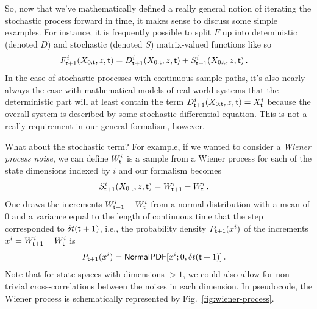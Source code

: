 So, now that we've mathematically defined a really general notion of iterating the stochastic process forward in time, it makes sense to discuss some simple examples. For instance, it is frequently possible to split $F$ up into deteministic (denoted $D$) and stochastic (denoted $S$) matrix-valued functions like so
\begin{align}
& F^{i}_{{\sf t}+1}(X_{0:{\sf t}},z,{\sf t}) = D^{i}_{{\sf t}+1}(X_{0:{\sf t}},z,{\sf t}) + S^{i}_{{\sf t}+1}(X_{0:{\sf t}},z,{\sf t}) \,.
\end{align}
In the case of stochastic processes with continuous sample paths, it's also nearly always the case with mathematical models of real-world systems that the deterministic part will at least contain the term $D^{i}_{{\sf t}+1}(X_{0:{\sf t}},z,{\sf t}) = X^i_{\sf t}$ because the overall system is described by some stochastic differential equation. This is not a really requirement in our general formalism, however.

What about the stochastic term? For example, if we wanted to consider a \emph{Wiener process noise}, we can define $W^i_{{\sf t}}$ is a sample from a Wiener process for each of the state dimensions indexed by $i$ and our formalism becomes
\begin{align}
& S^{i}_{{\sf t}+1}(X_{0:{\sf t}},z,{\sf t}) = W^i_{{\sf t}+1}-W^i_{\sf t} \label{eq:wiener}\,.
\end{align}
One draws the increments $W^i_{{\sf t}+1}-W^i_{\sf t}$ from a normal distribution with a mean of $0$ and a variance equal to the length of continuous time that the step corresponded to $\delta t({\sf t}+1)$, i.e., the probability density $P_{{\sf t}+1}(x^i)$ of the increments $x^i=W^i_{{\sf t}+1}-W^i_{\sf t}$ is
\begin{align}
P_{{\sf t}+1}(x^i) &= {\sf NormalPDF}[x^i;0,\delta t({\sf t}+1)] \,.
\end{align}
Note that for state spaces with dimensions $>1$, we could also allow for non-trivial cross-correlations between the noises in each dimension. In pseudocode, the Wiener process is schematically represented by Fig.~\ref{fig:wiener-process}.

